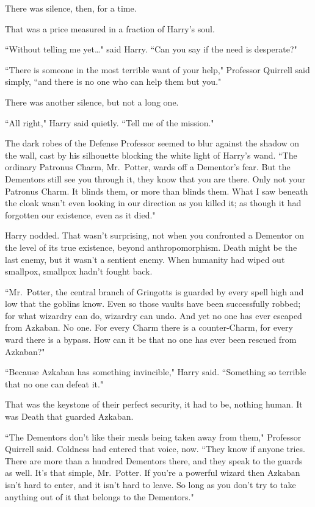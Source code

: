 There was silence, then, for a time.

That was a price measured in a fraction of Harry's soul.

``Without telling me yet{\ldots}" said Harry. ``Can you say if the need is desperate?"

``There is someone in the most terrible want of your help," Professor Quirrell said simply, ``and there is no one who can help them but you."

There was another silence, but not a long one.

``All right," Harry said quietly. ``Tell me of the mission."

The dark robes of the Defense Professor seemed to blur against the shadow on the wall, cast by his silhouette blocking the white light of Harry's wand. ``The ordinary Patronus Charm, Mr.~Potter, wards off a Dementor's fear. But the Dementors still see you through it, they know that you are there. Only not your Patronus Charm. It blinds them, or more than blinds them. What I saw beneath the cloak wasn't even looking in our direction as you killed it; as though it had forgotten our existence, even as it died."

Harry nodded. That wasn't surprising, not when you confronted a Dementor on the level of its true existence, beyond anthropomorphism. Death might be the last enemy, but it wasn't a sentient enemy. When humanity had wiped out smallpox, smallpox hadn't fought back.

``Mr.~Potter, the central branch of Gringotts is guarded by every spell high and low that the goblins know. Even so those vaults have been successfully robbed; for what wizardry can do, wizardry can undo. And yet no one has ever escaped from Azkaban. No one. For every Charm there is a counter-Charm, for every ward there is a bypass. How can it be that no one has ever been rescued from Azkaban?"

``Because Azkaban has something invincible," Harry said. ``Something so terrible that no one can defeat it."

That was the keystone of their perfect security, it had to be, nothing human. It was Death that guarded Azkaban.

``The Dementors don't like their meals being taken away from them," Professor Quirrell said. Coldness had entered that voice, now. ``They know if anyone tries. There are more than a hundred Dementors there, and they speak to the guards as well. It's that simple, Mr.~Potter. If you're a powerful wizard then Azkaban isn't hard to enter, and it isn't hard to leave. So long as you don't try to take anything out of it that belongs to the Dementors."

